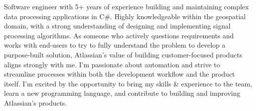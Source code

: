 \begin{justify}
Software engineer with 5+ years of experience building and maintaining complex data processing applications in C\#. Highly knowledgeable within the geospatial domain, with a strong understanding of designing and implementing signal processing algorithms. As someone who actively questions requirements and works with end-users to try to fully understand the problem to develop a purpose-built solution, Atlassian's value of building customer-focused products aligns strongly with me. I'm passionate about automation and strive to streamline processes within both the development workflow and the product itself. I'm excited by the opportunity to bring my skills \& experience to the team, learn a new programming language, and contribute to building and improving Atlassian's products.
\end{justify}